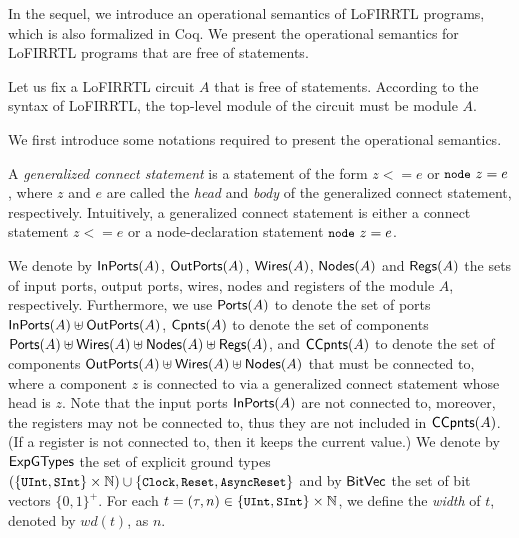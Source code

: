 
In the sequel, we introduce an operational semantics of LoFIRRTL programs, 
which is also formalized in Coq.
We present the operational semantics for LoFIRRTL programs that are free of  statements.



Let us fix a LoFIRRTL circuit $A$ that is free of  statements. According to the syntax of LoFIRRTL, the top-level module of the circuit must be module $A$.

We first introduce some notations required to present the operational semantics.


A \emph{generalized connect statement} is a statement of the form $z <= e$ or $\mbox{\tt \prettyll{node}}\ z = e$, where $z$ and $e$ are called the \emph{head} and \emph{body} of the generalized connect statement, respectively. Intuitively, a generalized connect statement is either a connect statement $z <= e$ or a node-declaration statement $\mbox{\tt \prettyll{node}}\ z = e$.


We denote by ${\sf InPorts}(A)$, ${\sf OutPorts}(A)$, ${\sf Wires}(A)$, ${\sf Nodes}(A)$
and ${\sf Regs}(A)$ the sets of input ports, output ports, wires, nodes and registers of the module $A$, respectively.
Furthermore, we use ${\sf Ports}(A)$ to denote the set of ports ${\sf InPorts}(A) \uplus {\sf OutPorts}(A)$,
${\sf Cpnts}(A)$ to denote the set of components ${\sf Ports}(A) \uplus {\sf Wires}(A) \uplus {\sf Nodes}(A) \uplus {\sf Regs}(A)$,
and ${\sf CCpnts}(A)$ to denote the set of components ${\sf OutPorts}(A) \uplus {\sf Wires}(A) \uplus {\sf Nodes}(A)$ that must be connected to, %
where a component $z$ is connected to via a generalized connect statement whose head is $z$.
Note that the input ports ${\sf InPorts}(A)$ are not connected to, moreover, the registers may not be connected to, thus they
are not included in ${\sf CCpnts}(A)$. (If a register is not connected to, then it keeps the current value.)
We denote by ${\sf ExpGTypes}$ the set of explicit ground types $(\{\mbox{\prettyll{UInt}}, \mbox{\prettyll{SInt}}\} \times \Nat) \cup \{\mbox{\prettyll{Clock}},
\mbox{\prettyll{Reset}}, \mbox{\prettyll{AsyncReset}}\}$ and by ${\sf BitVec}$ the set of bit vectors $\{0,1\}^+$.
For each $t = (\tau, n) \in \{\mbox{\prettyll{UInt}}, \mbox{\prettyll{SInt}}\} \times \Nat$, we define the \emph{width} of $t$, denoted by $wd(t)$, as $n$.



